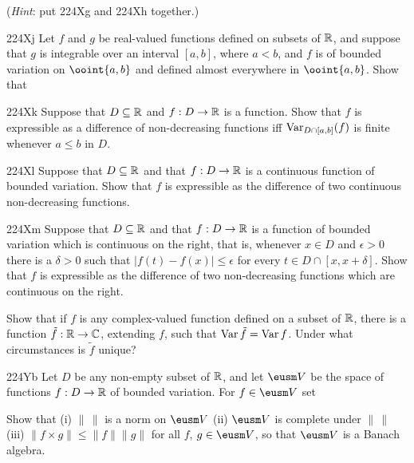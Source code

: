{

\noindent({\it Hint\/}: put 224Xg and 224Xh together.)

\spheader 224Xj Let $f$ and $g$ be real-valued
functions defined on subsets of $\Bbb R$, and suppose that $g$ is
integrable over an interval $[a,b]$, where $a<b$, and $f$ is of bounded
variation on $\ooint{a,b}$ and defined almost everywhere in
$\ooint{a,b}$.   Show that


\spheader 224Xk Suppose that $D\subseteq\Bbb R$ and
$f:D\to\Bbb R$ is a function.   Show that $f$ is
expressible as a difference of non-decreasing functions iff
$\mathop{\text{Var}}_{D\cap[a,b]}(f)$ is finite whenever $a\le b$ in $D$.

\spheader 224Xl
Suppose that $D\subseteq\Bbb R$ and that $f:D\to\Bbb R$ is a continuous
function of bounded variation.   Show that $f$ is expressible as the
difference of two continuous non-decreasing functions.

\spheader 224Xm
Suppose that $D\subseteq\Bbb R$ and that $f:D\to\Bbb R$ is a
function of bounded variation which is continuous on the right, that is,
whenever $x\in D$ and $\epsilon>0$ there is a $\delta>0$ such that
$|f(t)-f(x)|\le\epsilon$ for every $t\in D\cap[x,x+\delta]$.
Show that $f$ is expressible as the
difference of two non-decreasing functions which are continuous on the
right.

Show that if $f$ is any complex-valued function
defined on a subset of $\Bbb R$, there is a function
$\tilde f:\Bbb R\to\Bbb C$, extending $f$, such that
$\mathop{\text{Var}}\tilde f=\mathop{\text{Var}} f$.   Under what circumstances is $\tilde f$ unique?

\spheader 224Yb Let $D$ be any non-empty subset of $\Bbb R$, and
let $\eusm V$ be the space of functions $f:D\to\Bbb R$ of bounded
variation.   For $f\in\eusm V$ set


\noindent Show that (i) $\|\,\|$ is a norm on $\eusm V$ (ii) $\eusm V$
is complete under $\|\,\|$ (iii) $\|f\times g\|\le\|f\|\|g\|$ for all
$f$, $g\in\eusm V$, so that $\eusm V$ is a Banach algebra.

}
